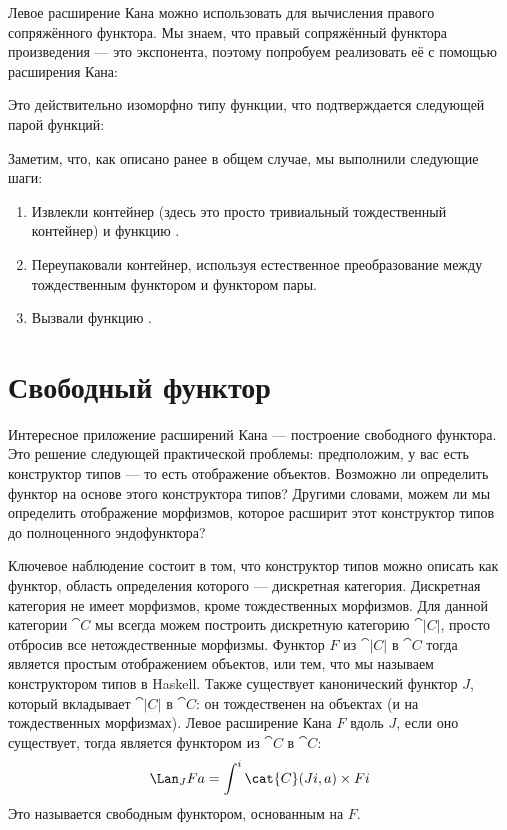 Левое расширение Кана можно использовать для вычисления правого сопряжённого
функтора. Мы знаем, что правый сопряжённый функтора произведения — это
экспонента, поэтому попробуем реализовать её с помощью расширения Кана:

Это действительно изоморфно типу функции, что подтверждается
следующей парой функций:

Заметим, что, как описано ранее в общем случае, мы выполнили
следующие шаги:

\begin{enumerate}
  \tightlist
  \item
        Извлекли контейнер  (здесь это
        просто тривиальный тождественный контейнер) и функцию .
  \item
        Переупаковали контейнер, используя естественное преобразование между
        тождественным функтором и функтором пары.
  \item
        Вызвали функцию .
\end{enumerate}

\section{Свободный функтор}

Интересное приложение расширений Кана — построение
свободного функтора. Это решение следующей практической проблемы:
предположим, у вас есть конструктор типов --- то есть отображение объектов. Возможно ли
определить функтор на основе этого конструктора типов? Другими
словами, можем ли мы определить отображение морфизмов, которое расширит этот конструктор типов до полноценного эндофунктора?

Ключевое наблюдение состоит в том, что конструктор типов можно описать как
функтор, область определения которого — дискретная категория. Дискретная категория не имеет
морфизмов, кроме тождественных морфизмов. Для данной категории $\cat{C}$
мы всегда можем построить дискретную категорию $\cat{|C|}$,
просто отбросив все нетождественные морфизмы. Функтор $F$
из $\cat{|C|}$ в $\cat{C}$ тогда является простым отображением
объектов, или тем, что мы называем конструктором типов в Haskell. Также существует
канонический функтор $J$, который вкладывает $\cat{|C|}$
в $\cat{C}$: он тождественен на объектах (и на тождественных морфизмах).
Левое расширение Кана $F$ вдоль $J$, если оно существует,
тогда является функтором из $\cat{C}$ в $\cat{C}$:
\[\Lan_{J}F a = \int^i \cat{C}(J i, a)\times{}F i\]
Это называется свободным функтором, основанным на $F$.

